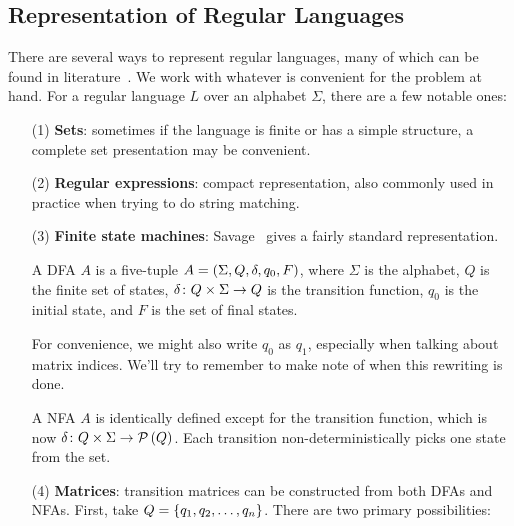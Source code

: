 \subsection{Representation of Regular Languages}
There are several ways to represent regular languages,
many of which can be found in literature~\cite{savage1998models}.
We work with whatever is convenient for the problem at hand.
For a regular language \(L\) over an alphabet \(\Sigma\),
there are a few notable ones:


\begin{enumerate}
  \item[(1)]
    \textbf{Sets}:
    sometimes if the language is finite or has a simple structure,
    a complete set presentation may be convenient.

  \item[(2)]
    \textbf{Regular expressions}:
    compact representation,
    also commonly used in practice when trying to do string matching.

  \item[(3)]
    \textbf{Finite state machines}:
    Savage~\cite{savage1998models} gives a fairly standard representation.

    \begin{definition}[DFA]
      A DFA \(A\) is a five-tuple \(A = \left(\Sigma, Q, \delta, q_0, F\right)\),
      where \(\Sigma\) is the alphabet, \(Q\) is the finite set of states,
      \(\delta \colon Q \times \Sigma \to Q\) is the transition function,
      \(q_0\) is the initial state, and \(F\) is the set of final states.
    \end{definition}

    For convenience, we might also write \(q_0\) as \(q_1\),
    especially when talking about matrix indices.
    We'll try to remember to make note of when this rewriting is done.

    \begin{definition}[NFA]
      A NFA \(A\) is identically defined except for the
      transition function, which is now
      \(\delta \colon Q \times \Sigma \to \mathcal{P}\left(Q\right)\).
      Each transition non-deterministically picks one state from the set.
    \end{definition}

  \item[(4)]
    \textbf{Matrices}:
    transition matrices can be constructed from both DFAs and NFAs.
    First, take \(Q = \left\{q_1, q_2, \ldots, q_n\right\}\).
    There are two primary possibilities:


\end{enumerate}
